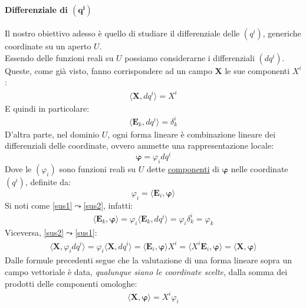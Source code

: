 \paragraph{Differenziale di $\mathbf{(q^i)}$} Il nostro obiettivo adesso è quello di studiare il differenziale delle $(q^i)$, generiche coordinate su un aperto $U$.\\
Essendo delle funzioni reali su $U$ possiamo considerarne i differenziali $(dq^i)$. Queste, come già visto, fanno corrispondere ad un campo $\mathbf{X}$ le sue componenti $X^i$:
\begin{align*}
    \langle\mathbf{X},dq^i\rangle=X^i
\end{align*}
E quindi in particolare:
\begin{align*}
    \langle \mathbf{E}_k,dq^i\rangle=\delta_k^i
\end{align*}
D'altra parte, nel dominio $U$, ogni forma lineare è combinazione lineare dei differenziali delle coordinate, ovvero ammette una rappresentazione locale:
\begin{equation}
    \label{sus1}
    \mathbf{\varphi}=\varphi_idq^i
\end{equation}
Dove le $(\varphi_i)$ sono funzioni reali su $U$ dette \underline{componenti} di $\mathbf{\varphi}$ nelle coordinate $(q^i)$, definite da:
\begin{equation}
    \label{sus2}
    \varphi_i=\langle\mathbf{E}_i,\mathbf{\varphi}\rangle
\end{equation}
Si noti come \ref{sus1}$\leadsto$\ref{sus2}, infatti:
\begin{align*}
    \langle \mathbf{E}_k,\mathbf{\varphi}\rangle = \varphi_i\langle \mathbf{E}_k,dq^i\rangle = \varphi_i \delta_k^i=\varphi_k
\end{align*}
Viceversa, \ref{sus2}$\leadsto$\ref{sus1}:
\begin{align*}
    \langle \mathbf{X},\varphi_idq^i\rangle=\varphi_i \langle \mathbf{X},dq^i\rangle= \langle \mathbf{E}_i, \mathbf{\varphi}\rangle X^i=\langle X^i\mathbf{E}_i, \mathbf{\varphi}\rangle =\langle \mathbf{X}, \mathbf{\varphi}\rangle
\end{align*}
Dalle formule precedenti segue che la valutazione di una forma lineare sopra un campo vettoriale è data, \textit{qualunque siano le coordinate scelte}, dalla somma dei prodotti delle componenti omologhe:
\begin{align*}
    \boxed{\langle \mathbf{X},\mathbf{\varphi}\rangle = X^i\varphi_i}
\end{align*}
